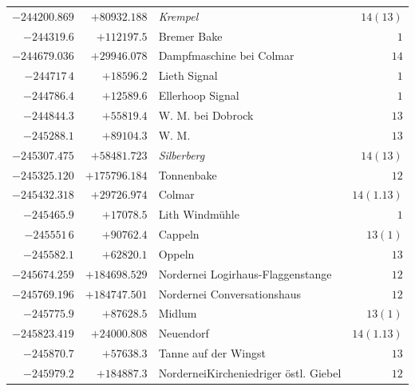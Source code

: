 \begin{center}
\begin{tabular}{r|r|p{170pt}|r}
\(-244200.869\)&\(+80932.188\)&\textit{Krempel}&\(14(13)\)\\
\(-244319.6\)&\(+112197.5\)&Bremer Bake&\(1\)\\
\(-244679.036\)&\(+29946.078\)&Dampfmaschine bei Colmar&\(14\)\\
\(-244717\,4\)&\(+18596.2\)&Lieth Signal&\(1\)\\
\(-244786.4\)&\(+12589.6\)&Ellerhoop Signal&\(1\)\\
\(-244844.3\)&\(+55819.4\)&W. M. bei Dobrock&\(13\)\\
\(-245288.1\)&\(+89104.3\)&W. M.&\(13\)\\
\(-245307.475\)&\(+58481.723\)&\textit{Silberberg}&\(14(13)\)\\
\(-245325.120\)&\(+175796.184\)&Tonnenbake&\(12\)\\
\(-245432.318\)&\(+29726.974\)&Colmar&\(14(1.13)\)\\
\(-245465.9\)&\(+17078.5\)&Lith Windmühle&\(1\)\\
\(-245551\,6\)&\(+90762.4\)&Cappeln&\(13(1)\)\\
\(-245582.1\)&\(+62820.1\)&Oppeln&\(13\)\\
\(-245674.259\)&\(+184698.529\)&Nordernei Logirhaus-Flaggenstange&\(12\)\\
\(-245769.196\)&\(+184747.501\)&Nordernei Conversationshaus&\(12\)\\
\(-245775.9\)&\(+87628.5\)&Midlum&\(13(1)\)\\
\(-245823.419\)&\(+24000.808\)&Neuendorf&\(14(1.13)\)\\
\(-245870.7\)&\(+57638.3\)&Tanne auf der Wingst&\(13\)\\
\(-245979.2\)&\(+184887.3\)&NorderneiKircheniedriger östl. Giebel&\(12\)\\
\hline\end{tabular}\endgroup\end{center}
